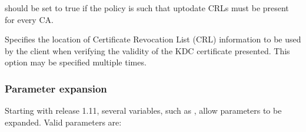 \documentclass[letterpaper,10pt,english]{sphinxmanual}
\begin{document}
\begin{description}
\sphinxAtStartPar
{} should be set to true if the
policy is such that up\sphinxhyphen{}to\sphinxhyphen{}date CRLs must be present for every CA.

\item[{\sphinxstylestrong{pkinit\_revoke}}] \leavevmode
\sphinxAtStartPar
Specifies the location of Certificate Revocation List (CRL)
information to be used by the client when verifying the validity
of the KDC certificate presented.  This option may be specified
multiple times.

\end{description}


\subsubsection{Parameter expansion}
\label{\detokenize{admin/conf_files/krb5_conf:parameter-expansion}}\label{\detokenize{admin/conf_files/krb5_conf:id7}}
\sphinxAtStartPar
Starting with release 1.11, several variables, such as
, allow parameters to be expanded.
Valid parameters are:
\end{document}
